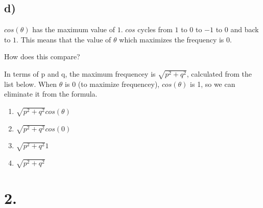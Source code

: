 \subsection*{d)}
\(cos(\theta)\) has the maximum value of \(1\).
\(cos\) cycles from \(1\) to \(0\) to \(-1\) to \(0\) and back to \(1\).
This means that the value of \(\theta\) which maximizes the frequency is \(0\).

How does this compare?

In terms of p and q, the maximum frequencey is \(\sqrt{p^2 + q^2}\), calculated from the list below.
When \(\theta\) is \(0\) (to maximize frequencey), \(cos(\theta)\) is 1, so we can eliminate it from the formula.
\begin{enumerate}
  \item \(\sqrt{p^2 + q^2} cos(\theta)\)
  \item \(\sqrt{p^2 + q^2} cos(0)\)
  \item \(\sqrt{p^2 + q^2} 1\)
  \item \(\sqrt{p^2 + q^2}\)
\end{enumerate}

\section*{2.}

